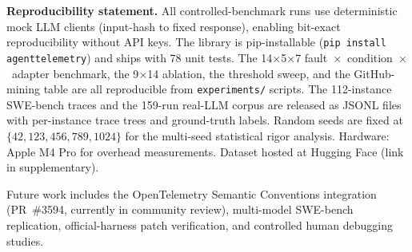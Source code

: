 \documentclass{article}
\begin{document}
\textbf{Reproducibility statement.}
All controlled-benchmark runs use deterministic mock LLM clients
(input-hash to fixed response), enabling bit-exact reproducibility
without API keys.  The library is pip-installable
(\texttt{pip install agenttelemetry}) and ships with 78 unit tests.
The 14$\times$5$\times$7 fault~$\times$~condition~$\times$~adapter
benchmark, the 9$\times$14 ablation, the threshold sweep, and the
GitHub-mining table are all reproducible from
\texttt{experiments/} scripts.  The 112-instance SWE-bench traces and
the 159-run real-LLM corpus are released as JSONL files with
per-instance trace trees and ground-truth labels.  Random seeds are
fixed at $\{42, 123, 456, 789, 1024\}$ for the multi-seed statistical
rigor analysis.  Hardware: Apple M4 Pro for overhead measurements.
Dataset hosted at Hugging Face (link in supplementary).

Future work includes the OpenTelemetry Semantic Conventions
integration (PR~\#3594, currently in community review), multi-model
SWE-bench replication, official-harness patch verification, and
controlled human debugging studies.



\end{document}
